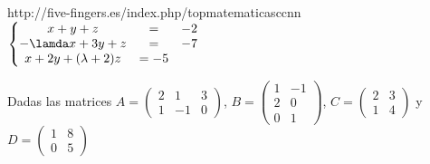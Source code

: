 \documentclass[addpoints,spanish, 12pt,a4paper]{exam}
\begin{document}
\begin{questions}

 http://five-fingers.es/index.php/topmatematicasccnn
$\left\{\begin{matrix} x+y+z & = & -2 \\
-\lamda x + 3y +z & = & -7 \\
x + 2y  + (\lambda +2)z & = -5 &
\end{matrix}\right.
$

\question Dadas las matrices  $A=\left(\begin{matrix}2 & 1 & 3\\1 & -1 & 0\end{matrix}\right)$,  $B=\left(\begin{matrix}1 & -1\\2 & 0\\0 & 1\end{matrix}\right)$, $C=\left(\begin{matrix}2 & 3\\1 & 4\end{matrix}\right)$ y $D=\left(\begin{matrix}1 & 8\\0 & 5\end{matrix}\right)$ 

\end{questions}
\end{document}
